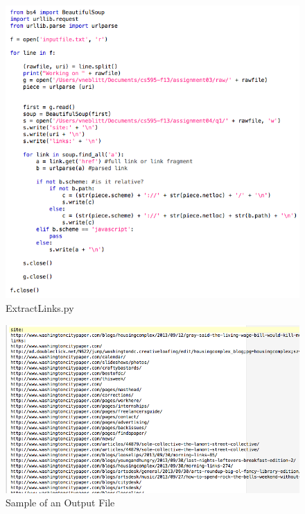 \documentclass{article}
\begin{document}
\begin{figure}[H]
\centering
\includegraphics[scale=0.60]{q1/extractlinkscode}
\caption{ExtractLinks.py}
\label{extractlinks}
\end{figure}

\begin{figure}[H]
\centering
\includegraphics[scale=0.50]{q1/sampleoutputfile}
\caption{Sample of an Output File}
\label{sampleoutputfile}
\end{figure}

\end{document}
